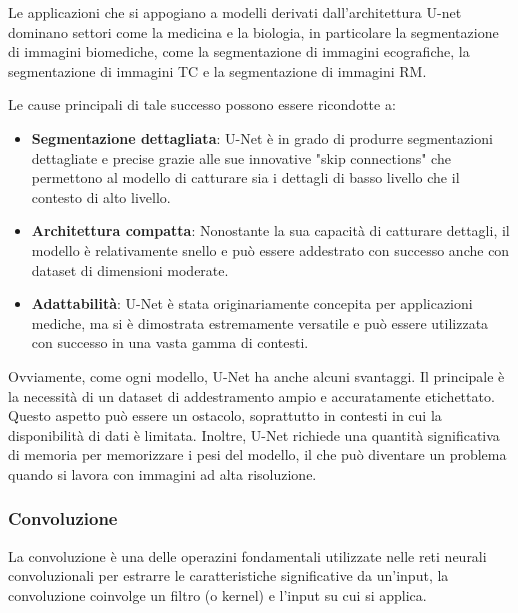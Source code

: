 Le applicazioni che si appogiano a modelli derivati dall'architettura U-net dominano settori come la medicina e la biologia, in particolare la segmentazione di immagini biomediche, come la segmentazione di immagini ecografiche, la segmentazione di immagini TC e la segmentazione di immagini RM.

Le cause principali di tale successo possono essere ricondotte a:
\begin{itemize}
  \item \textbf{Segmentazione dettagliata}: U-Net è in grado di produrre segmentazioni dettagliate e precise grazie alle sue innovative "skip connections" che permettono al modello di catturare sia i dettagli di basso livello che il contesto di alto livello.
  \item \textbf{Architettura compatta}: Nonostante la sua capacità di catturare dettagli, il modello è relativamente snello e può essere addestrato con successo anche con dataset di dimensioni moderate.
  \item \textbf{Adattabilità}: U-Net è stata originariamente concepita per applicazioni mediche, ma si è dimostrata estremamente versatile e può essere utilizzata con successo in una vasta gamma di contesti.
\end{itemize}

Ovviamente, come ogni modello, U-Net ha anche alcuni svantaggi. Il principale è la necessità di un dataset di addestramento ampio e accuratamente etichettato. Questo aspetto può essere un ostacolo, soprattutto in contesti in cui la disponibilità di dati è limitata. Inoltre, U-Net richiede una quantità significativa di memoria per memorizzare i pesi del modello, il che può diventare un problema quando si lavora con immagini ad alta risoluzione.


\subsubsection{Convoluzione} %
\label{sec:convoluzione}


La convoluzione è una delle operazini fondamentali utilizzate nelle reti neurali convoluzionali per estrarre le caratteristiche significative da un'input, la convoluzione coinvolge un filtro (o kernel) e l'input su cui si applica.

